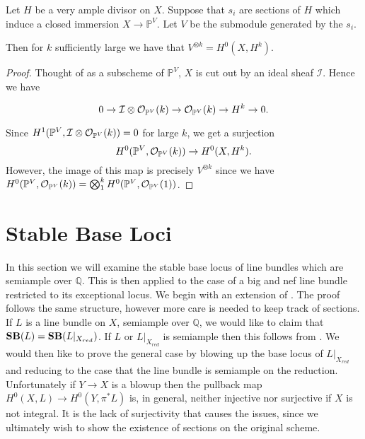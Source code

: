 \begin{lemma}\label{ampall}
	
	Let $H$ be a very ample divisor on $X$. Suppose that $s_{i}$ are sections of $H$ which induce a closed immersion $X \to \mathbb{P}^{V}$. Let $V$ be the submodule generated by the $s_{i}$.
	
	Then for $k$ sufficiently large we have that $V^{\otimes k}=H^{0}(X,H^{k})$.
	
\end{lemma}

\begin{proof}
	
	Thought of as a subscheme of $\mathbb{P}^{V}$, $X$ is cut out by an ideal sheaf $\mathcal{I}$. Hence we have 
	
	\[0 \to \mathcal{I}\otimes \ox[\mathbb{P}^{V}](k) \to \ox[\mathbb{P}^{V}](k) \to H^{k} \to 0.\]
	
	Since $H^{1}(\mathbb{P}^{V}, \mathcal{I}\otimes \ox[\mathbb{P}^{V}](k))=0$ for large $k$, we get a surjection $$H^{0}(\mathbb{P}^{V},\ox[\mathbb{P}^{V}](k)) \to H^{0}(X,H^{k}).$$ However, the image of this map is precisely $V^{\otimes k}$ since we have $H^{0}(\mathbb{P}^{V},\ox[\mathbb{P}^{V}](k))=\bigotimes_{1}^{k}H^{0}(\mathbb{P}^{V},\ox[\mathbb{P}^{V}](1))$.
	
	
	
\end{proof}

\section{Stable Base Loci}

In this section we will examine the stable base locus of line bundles which are semiample over $\mathbb{Q}$. This is then applied to the case of a big and nef line bundle restricted to its exceptional locus.  We begin with an extension of \cite[Theorem 1.10]{witaszek2020keels}. The proof follows the same structure, however more care is needed to keep track of sections.\\

If $L$ is a line bundle on $X$, semiample over $\mathbb{Q}$, we would like to claim that $\SB(L)=\SB(L|_{X_{red}})$. If $L$ or $L|_{X_{red}}$ is semiample then this follows from \cite[Thereom 1.10]{witaszek2020keels}. We would then like to prove the general case by blowing up the base locus of $L|_{X_{red}}$ and reducing to the case that the line bundle is semiample on the reduction. Unfortunately if $Y \to X$ is a blowup then the pullback map $H^{0}(X,L) \to H^{0}(Y,\pi^{*}L)$ is, in general, neither injective nor surjective if $X$ is not integral. It is the lack of surjectivity that causes the issues, since we ultimately wish to show the existence of sections on the original scheme.\\ 

